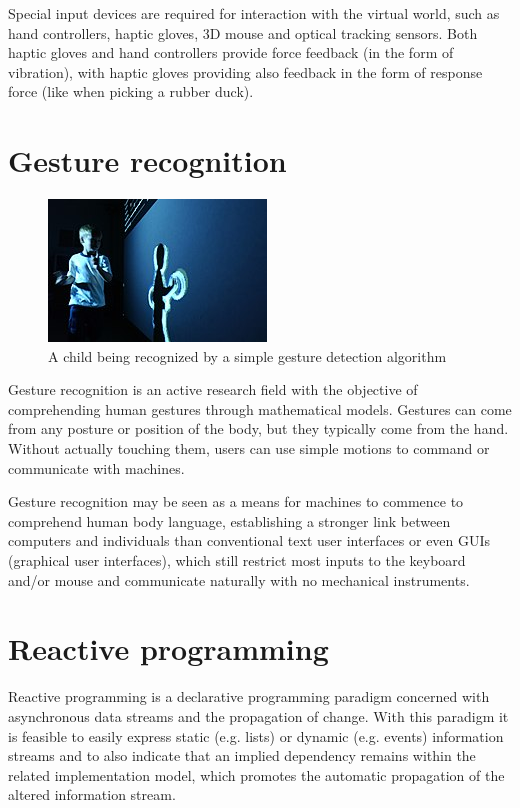 \documentclass[12pt,a4paper,twoside]{report}
\begin{document}
Special input devices are required for interaction with the virtual world, such as hand controllers, haptic gloves, 3D mouse and optical tracking sensors. Both haptic gloves and hand controllers provide force feedback (in the form of vibration), with haptic gloves providing also feedback in the form of response force (like when picking a rubber duck).

\section{Gesture recognition}

\begin{figure}
  \includegraphics[width=\linewidth]{img/GestRecog_child.jpg}
  \caption{A child being recognized by a simple gesture detection algorithm}
  \label{fig:child}
\end{figure}

Gesture recognition is an active research field with the objective of comprehending human gestures through mathematical models. Gestures can come from any posture or position of the body, but they typically come from the hand. Without actually touching them, users can use simple motions to command or communicate with machines.

Gesture recognition may be seen as a means for machines to commence to comprehend human body language, establishing a stronger link between computers and individuals than conventional text user interfaces or even GUIs (graphical user interfaces), which still restrict most inputs to the keyboard and/or mouse and communicate naturally with no mechanical instruments.

\section{Reactive programming}
Reactive programming is a declarative programming paradigm concerned with asynchronous data streams and the propagation of change. With this paradigm it is feasible to easily express static (e.g. lists) or dynamic (e.g. events) information streams and to also indicate that an implied dependency remains within the related implementation model, which promotes the automatic propagation of the altered information stream.
\end{document}
